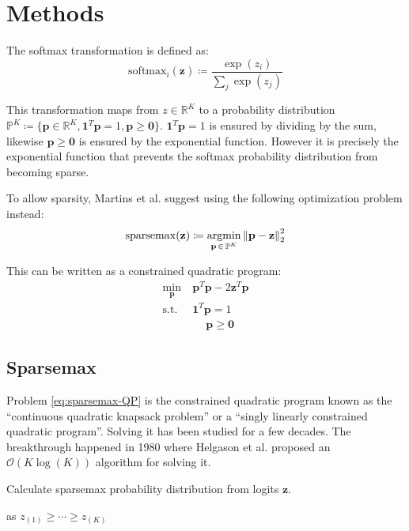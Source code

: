 \section{Methods}

The softmax transformation is defined as:
\begin{equation}
\mathrm{softmax}_i(\mathbf{z}) \coloneqq \frac{\exp(z_i)}{\sum_{j} \exp(z_j)}
\end{equation}

This transformation maps from $z \in \mathbb{R}^K$ to a probability distribution $\mathbb{P}^K \coloneqq \{ \mathbf{p} \in \mathbb{R}^K,  \mathbf{1}^T \mathbf{p} = 1, \mathbf{p} \ge \mathbf{0} \}$. $\mathbf{1}^T \mathbf{p} = 1$ is ensured by dividing by the sum, likewise $\mathbf{p} \ge \mathbf{0}$ is ensured by the exponential function. However it is precisely the exponential function that prevents the softmax probability distribution from becoming sparse.

To allow sparsity, Martins et al. \cite{sparsemax} suggest  using the following optimization problem instead:
\begin{equation}
\mathrm{sparsemax}(\mathbf{z}) \coloneqq \operatorname*{argmin}_{\mathbf{p}\, \in\, \mathbb{P}^K} \left\lVert \mathbf{p} - \mathbf{z} \right\rVert_2^2 
\end{equation}

This can be written as a constrained quadratic program:
\begin{equation}
\begin{aligned}
\min_{\mathbf{p}}\ &\mathbf{p}^T \mathbf{p} - 2 \mathbf{z}^T \mathbf{p} \\
\text{s.t. } &\mathbf{1}^T \mathbf{p} = 1 \\
&\quad\ \mathbf{p} \ge \mathbf{0}
\end{aligned}
\label{eq:sparsemax-QP}
\end{equation}

\subsection{Sparsemax}
Problem \eqref{eq:sparsemax-QP} is the constrained quadratic program known as the ``continuous quadratic knapsack problem'' or a ``singly linearly constrained quadratic program''. Solving it has been studied for a few decades. The breakthrough happened in 1980 where Helgason et al. \cite{Helgason1980} proposed an $\mathcal{O}(K \log(K))$ algorithm for solving it.
\begin{algorithm}[H]
  \caption{Calculate sparsemax probability distribution from logits $\mathbf{z}$.}
  \begin{algorithmic}[1]
      \State {} as $z_{(1)} \ge \cdots \ge z_{(K)}$
      \State {}
    \EndFunction
  \end{algorithmic}
\end{algorithm}

